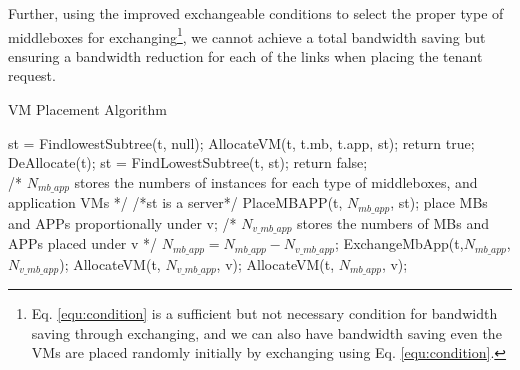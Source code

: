 \documentclass[review]{elsarticle}
\begin{document}
Further, using the improved exchangeable conditions to select the proper type of middleboxes for exchanging\footnote{Eq. \ref{equ:condition} is a sufficient but not necessary condition for bandwidth saving through exchanging, and we can also have bandwidth saving even the VMs are placed randomly initially by exchanging using Eq. \ref{equ:condition}.},
we cannot achieve a total bandwidth saving but ensuring a bandwidth reduction for each of the links when placing the tenant request.

\begin{algorithm}%
	\caption{VM Placement Algorithm}
	\label{alg1}
	\begin{algorithmic}[1]
		\State st = FindlowestSubtree(t, null);
		\State AllocateVM(t, t.mb, t.app, st);
		\State return true;
		\EndIf 
		\State DeAllocate(t);
		\State st = FindLowestSubtree(t, st);
		\EndWhile
		\State return false;
		\EndFunction
		\\
		/* $N_{mb\_app}$ stores the numbers of instances for 
		\State each type of middleboxes, and application VMs */
		 /*st is a server*/
		\State PlaceMBAPP(t, $N_{mb\_app}$, st);
		\Else
		\State place
		MBs and APPs \State proportionally under v;
		\State /* $N_{v\_mb\_app}$ stores the numbers of 
		\State MBs and APPs placed under v */
		\State $N_{mb\_app} = N_{mb\_app} - N_{v\_mb\_app}$;
		\State ExchangeMbApp(t,$N_{mb\_app}$,$N_{v\_mb\_app}$);
		\State AllocateVM(t, $N_{v\_mb\_app}$, v);
		\Else
		\State AllocateVM(t, $N_{mb\_app}$, v);
		\EndIf
		\EndIf
		\EndFor
		\EndIf
		\EndFunction %
	\end{algorithmic}
\end{algorithm}
\end{document}
